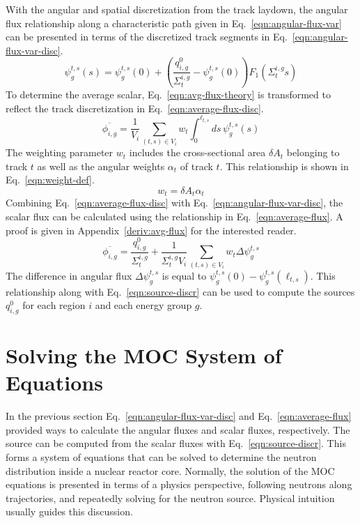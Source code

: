 With the angular and spatial discretization from the track laydown, the angular flux relationship along a characteristic path given in Eq.~\ref{eqn:angular-flux-var} can be presented in terms of the discretized track segments in Eq.~\ref{eqn:angular-flux-var-disc}.
\begin{dmath}
	\psi_g^{t,s}(s) = \psi^{t,s}_g(0) + \left( \frac{q^0_{i,g}}{\Sigma_{t}^{i,g}} - \psi_g^{t,s}(0) \right) F_1\left(\Sigma_{t}^{i,g} s \right)
	\label{eqn:angular-flux-var-disc}
\end{dmath}
To determine the average scalar, Eq.~\ref{eqn:avg-flux-theory} is transformed to reflect the track discretization in Eq.~\ref{eqn:average-flux-disc}.
\begin{dmath}
	\overline{\phi_{i,g}} = \frac{1}{V_i} \sum_{(t,s) \in V_i} w_{t} \int_{0}^{\ell_{t,s}} ds \, \psi^{t,s}_g(s)
	\label{eqn:average-flux-disc}
\end{dmath}
The weighting parameter $w_t$ includes the cross-sectional area $\delta A_{t}$ belonging to track $t$ as well as the angular weights $\alpha_t$ of track $t$. This relationship is shown in Eq.~\ref{eqn:weight-def}.
\begin{equation}
 w_{t} = \delta A_{t} \alpha_t
 \label{eqn:weight-def}
\end{equation}
Combining Eq.~\ref{eqn:average-flux-disc} with Eq.~\ref{eqn:angular-flux-var-disc}, the scalar flux can be calculated using the relationship in Eq.~\ref{eqn:average-flux}. A proof is given in Appendix~\ref{deriv:avg-flux} for the interested reader.
\begin{dmath}
	\overline{\phi_{i,g}} = \frac{q^0_{i,g}}{\Sigma_{t}^{i,g}} + \frac{1}{\Sigma_{t}^{i,g} V_i} \sum_{(t,s) \in V_i} w_{t} \Delta \psi_g^{t,s}
	\label{eqn:average-flux}
\end{dmath}
The difference in angular flux $\Delta \psi_g^{t,s}$ is equal to $\psi_g^{t,s}(0) - \psi_g^{t,s}(\ell_{t,s})$. This relationship along with Eq.~\ref{eqn:source-discr} can be used to compute the sources $q^0_{i,g}$ for each region $i$ and each energy group $g$.


\section{Solving the MOC System of Equations}

In the previous section Eq.~\ref{eqn:angular-flux-var-disc} and Eq.~\ref{eqn:average-flux} provided ways to calculate the angular fluxes and scalar fluxes, respectively. The source can be computed from the scalar fluxes with Eq.~\ref{eqn:source-discr}. This forms a system of equations that can be solved to determine the neutron distribution inside a nuclear reactor core. Normally, the solution of the MOC equations is presented in terms of a physics perspective, following neutrons along trajectories, and repeatedly solving for the neutron source. Physical intuition usually guides this discussion.

